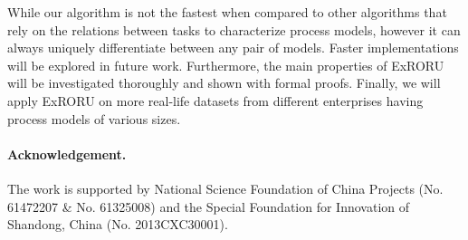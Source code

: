 \documentclass{llncs}
\begin{document}
While our algorithm is not the fastest when compared to other algorithms that rely on the relations between tasks to characterize process models, however it can always uniquely differentiate between any pair of models. Faster implementations will be explored in future work. Furthermore, the main properties of ExRORU will be investigated thoroughly and shown with formal proofs. Finally, we will apply ExRORU on more real-life datasets from different enterprises having process models of various sizes.

\paragraph{\textbf{Acknowledgement.}} The work is supported by National Science Foundation of
China Projects (No. 61472207 \& No. 61325008) and the Special Foundation for Innovation of
Shandong, China (No. 2013CXC30001).



\end{document}
